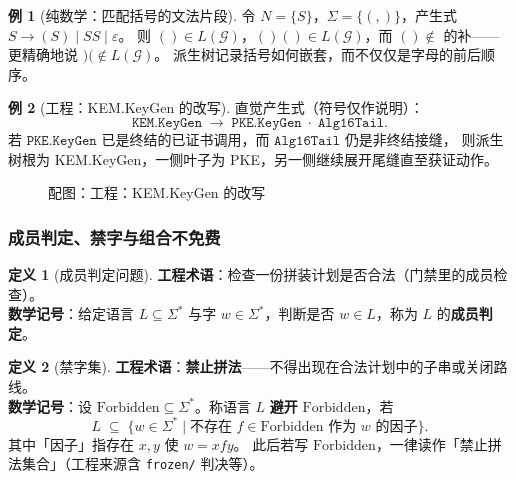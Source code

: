 \documentclass[UTF8,a4paper,11pt]{ctexart}
\theoremstyle{definition}
\newtheorem{definition}{定义}[section]
\newtheorem{example}{例}[section]
\theoremstyle{plain}
\theoremstyle{remark}
\numberwithin{figure}{section}
\numberwithin{table}{section}
\begin{document}
\begin{example}[纯数学：匹配括号的文法片段]
令 $N=\{S\}$，$\Sigma=\{(,)\}$，产生式 $S\to(S)\mid SS\mid\varepsilon$。
则 $()\in L(\mathcal{G})$，$()()\in L(\mathcal{G})$，而 $()\notin$ 的补——更精确地说 $)(\notin L(\mathcal{G})$。
派生树记录括号如何嵌套，而不仅仅是字母的前后顺序。
\end{example}

\begin{example}[工程：KEM.KeyGen 的改写]
直觉产生式（符号仅作说明）：
\[
\texttt{KEM.KeyGen}
\;\to\;
\texttt{PKE.KeyGen}\;\cdot\;\texttt{Alg16Tail}.
\]
若 $\texttt{PKE.KeyGen}$ 已是终结的已证书调用，而 $\texttt{Alg16Tail}$ 仍是非终结接缝，
则派生树根为 KEM.KeyGen，一侧叶子为 PKE，另一侧继续展开尾缝直至获证动作。
\begin{figure}[H]
\centering
{}
\caption{配图：工程：KEM.KeyGen 的改写}
\label{fig:auto-15}
\end{figure}
\end{example}

\subsubsection{成员判定、禁字与组合不免费}
\label{sec:membership}

\begin{definition}[成员判定问题]
\textbf{工程术语}：检查一份拼装计划是否合法（门禁里的成员检查）。\\
\textbf{数学记号}：给定语言 $L\subseteq\Sigma^*$ 与字 $w\in\Sigma^*$，判断是否 $w\in L$，称为 $L$ 的\textbf{成员判定}。
\end{definition}

\begin{definition}[禁字集]
\label{def:forb}
\textbf{工程术语}：\textbf{禁止拼法}——不得出现在合法计划中的子串或关闭路线。\\
\textbf{数学记号}：设 $\mathrm{Forbidden}\subseteq\Sigma^*$。称语言 $L$ \textbf{避开} $\mathrm{Forbidden}$，若
\[
L \;\subseteq\; \{w\in\Sigma^*\mid \text{不存在 }f\in\mathrm{Forbidden}\text{ 作为 }w\text{ 的因子}\}.
\]
其中「因子」指存在 $x,y$ 使 $w=xfy$。
此后若写 $\mathrm{Forbidden}$，一律读作「禁止拼法集合」（工程来源含 \texttt{frozen/} 判决等）。
\end{definition}
\end{document}
